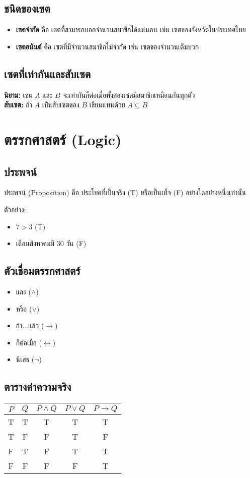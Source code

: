 \documentclass[a4paper,12pt]{article}
\begin{document}
\subsection{ชนิดของเซต}
\begin{itemize}
    \item \textbf{เซตจำกัด} คือ เซตที่สามารถบอกจำนวนสมาชิกได้แน่นอน เช่น เซตของจังหวัดในประเทศไทย
    \item \textbf{เซตอนันต์} คือ เซตที่มีจำนวนสมาชิกไม่จำกัด เช่น เซตของจำนวนเต็มบวก
\end{itemize}

\subsection{เซตที่เท่ากันและสับเซต}
\textbf{นิยาม:} เซต $A$ และ $B$ จะเท่ากันก็ต่อเมื่อทั้งสองเซตมีสมาชิกเหมือนกันทุกตัว \\

\textbf{สับเซต:} ถ้า $A$ เป็นสับเซตของ $B$ เขียนแทนด้วย $A \subseteq B$

\section{ตรรกศาสตร์ (Logic)}
\subsection{ประพจน์}
ประพจน์ (Proposition) คือ ประโยคที่เป็นจริง (T) หรือเป็นเท็จ (F) อย่างใดอย่างหนึ่งเท่านั้น

ตัวอย่าง:
\begin{itemize}
    \item $7 > 3$ (T)
    \item เดือนสิงหาคมมี 30 วัน (F)
\end{itemize}

\subsection{ตัวเชื่อมตรรกศาสตร์}
\begin{itemize}
    \item และ ($\land$)
    \item หรือ ($\lor$)
    \item ถ้า...แล้ว ($\rightarrow$)
    \item ก็ต่อเมื่อ ($\leftrightarrow$)
    \item นิเสธ ($\neg$)
\end{itemize}

\subsection{ตารางค่าความจริง}
\begin{center}
\begin{tabular}{|c|c|c|c|c|}
\hline
$P$ & $Q$ & $P \land Q$ & $P \lor Q$ & $P \rightarrow Q$ \\
\hline
T & T & T & T & T \\
T & F & F & T & F \\
F & T & F & T & T \\
F & F & F & F & T \\
\hline
\end{tabular}
\end{center}
\end{document}

